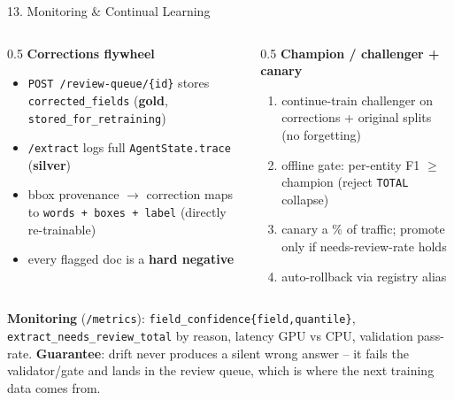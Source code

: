 \documentclass[10pt,aspectratio=169]{beamer}
\begin{document}
\begin{frame}{13. Monitoring \& Continual Learning}
\begin{columns}[T]
\begin{column}{0.5\textwidth}
\textbf{Corrections flywheel}
\begin{itemize}\small
  \item \texttt{POST /review-queue/\{id\}} stores \texttt{corrected\_fields} (\textbf{gold}, \texttt{stored\_for\_retraining})
  \item \texttt{/extract} logs full \texttt{AgentState.trace} (\textbf{silver})
  \item bbox provenance $\to$ correction maps to \texttt{words + boxes + label} (directly re-trainable)
  \item every flagged doc is a \textbf{hard negative}
\end{itemize}
\end{column}
\begin{column}{0.5\textwidth}
\textbf{Champion / challenger + canary}
\begin{enumerate}\small
  \item continue-train challenger on corrections + original splits (no forgetting)
  \item offline gate: per-entity F1 $\geq$ champion (reject \texttt{TOTAL} collapse)
  \item canary a \% of traffic; promote only if needs-review-rate holds
  \item auto-rollback via registry alias
\end{enumerate}
\end{column}
\end{columns}

\vspace{0.15cm}
\centering
\scriptsize \textbf{Monitoring} (\texttt{/metrics}): \texttt{field\_confidence\{field,quantile\}}, \texttt{extract\_needs\_review\_total} by reason, latency GPU vs CPU, validation pass-rate. \textbf{Guarantee}: drift never produces a silent wrong answer -- it fails the validator/gate and lands in the review queue, which is where the next training data comes from.
\end{frame}
\end{document}
